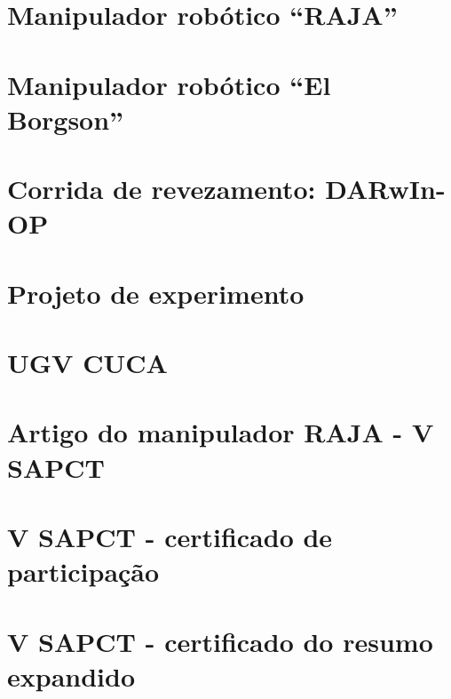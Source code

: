 \documentclass[fancyheadings, fancychapter, sureport]{Classes/a-prj}
\begin{document}
    \begin{thesisappendices}
        \chapter{Manipulador robótico ``RAJA''}
        \label{app:raja}
        
        

        \chapter{Manipulador robótico ``El Borgson''}
        \label{app:elborgson}
        

        \chapter{Corrida de revezamento: DARwIn-OP}
        \label{app:darwin}
        

        \chapter{Projeto de experimento}
        \label{app:doe}
        

        \chapter{UGV CUCA}
        \label{app:cuca}
        

        \chapter{Artigo do manipulador RAJA - V SAPCT}
        \label{app:rajapaper}
        

        \chapter{V SAPCT - certificado de participação }
        \label{app:sapctpart}
        

        \chapter{V SAPCT - certificado do resumo expandido }
        \label{app:sapctresumo}
        


\end{thesisappendices}
\end{document}

